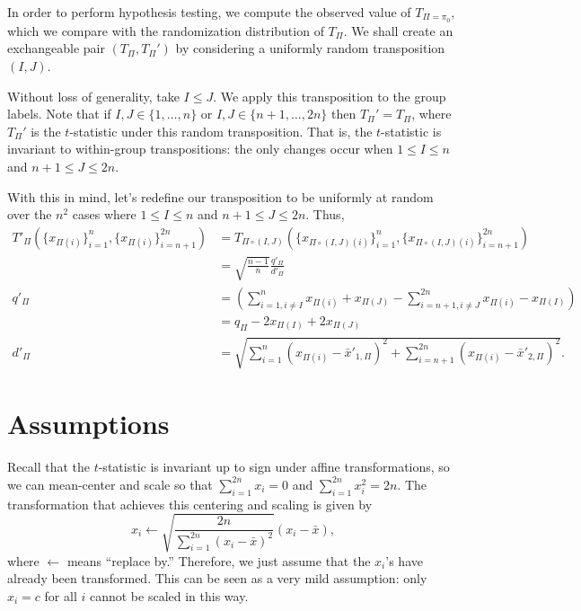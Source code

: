 In order to perform hypothesis testing, we compute the observed value
of $T_{\Pi=\pi_0}$, which we compare with the randomization
distribution of $T_{\Pi}$.  We shall create an exchangeable pair
$(T_{\Pi}, T_{\Pi}')$ by considering a uniformly random transposition
$(I, J)$.

Without loss of generality, take $I \leq J$.  We apply this transposition to the
group labels.  Note that if $I, J \in \{1,\ldots,n\}$ or $I, J \in
\{n+1,\ldots,2n\}$ then $T_{\Pi}' = T_{\Pi}$, where $T_{\Pi}'$ is the
$t$-statistic under this random transposition.  That is, the
$t$-statistic is invariant to within-group transpositions: the only
changes occur when $1 \leq I \leq n$ and $n + 1 \leq J \leq 2n$.

With this in mind, let's redefine our transposition to be uniformly at
random over the $n^2$ cases where $1 \leq I \leq n$ and $n + 1 \leq J
\leq 2n$. Thus,
\begin{align*}
  T'_{\Pi}(\{x_{\Pi(i)}\}_{i=1}^n, \{x_{\Pi(i)}\}_{i=n+1}^{2n})
  &= T_{\Pi \circ (I,J)}(\{x_{\Pi \circ (I,J)(i)}\}_{i=1}^n, \{x_{\Pi \circ (I,J)(i)}\}_{i=n+1}^{2n}) \\
  &= \sqrt{\frac{n-1}{n}}\frac{q'_{\Pi}}{d'_{\Pi}} \\
  q'_{\Pi} &= \left (\sum_{i=1, i\neq I}^n x_{\Pi(i)} + x_{\Pi(J)} -
    \sum_{i=n+1, i\neq J}^{2n}x_{\Pi(i)} - x_{\Pi(I)} \right ) \\
  &= q_{\Pi} - 2x_{\Pi(I)} + 2x_{\Pi(J)} \\
  d'_{\Pi} &= \sqrt{\sum_{i=1}^n(x_{\Pi(i)} - \bar{x}'_{1, \Pi})^{2} +
    \sum_{i=n+1}^{2n}(x_{\Pi(i)} - \bar{x}'_{2, \Pi})^{2}}.
\end{align*}

\section{Assumptions}
Recall that the $t$-statistic is invariant up to sign under affine
transformations, so we can mean-center and scale so that
$\sum_{i=1}^{2n} x_{i} = 0$ and $\sum_{i=1}^{2n} x_{i}^2 = 2n$.  The
transformation that achieves this centering and scaling is given by
\begin{equation}
  x_i \leftarrow \sqrt{\frac{2n}{\sum_{i=1}^{2n} (x_{i} - \bar{x})^2}}(x_{i}-\bar{x}),
\end{equation}
where $\leftarrow$ means ``replace by.''  Therefore, we
just assume that the $x_{i}$'s have already been transformed.  This
can be seen as a very mild assumption: only $x_i = c$ for all $i$
cannot be scaled in this way.

